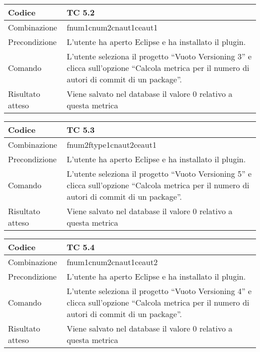 \begin{table}[ht]
\begin{tabular}{|p{3cm}|p{9cm}|}
\hline
\cellcolor{lightgray}Codice				& TC 5.2								\\
\hline
\cellcolor{lightgray}Combinazione		& fnum1cnum2cnaut1ceaut1 									\\
\hline
\cellcolor{lightgray}Precondizione		& L'utente ha aperto Eclipse e ha installato il plugin.				\\
\hline
\cellcolor{lightgray}Comando			& L'utente seleziona il progetto ``Vuoto Versioning 3''  e clicca sull'opzione ``Calcola metrica per il numero di autori di commit di un package''.	\\
\hline
\cellcolor{lightgray}Risultato atteso	& Viene salvato nel database il valore 0 relativo a questa metrica	\\
\hline
\end{tabular}
\end{table}

\begin{table}[ht]
\begin{tabular}{|p{3cm}|p{9cm}|}
\hline
\cellcolor{lightgray}Codice				& TC 5.3								\\
\hline
\cellcolor{lightgray}Combinazione		& fnum2ftype1cnaut2ceaut1								\\
\hline
\cellcolor{lightgray}Precondizione		& L'utente ha aperto Eclipse e ha installato il plugin.					\\
\hline
\cellcolor{lightgray}Comando			& L'utente seleziona il progetto ``Vuoto Versioning 5''  e clicca sull'opzione ``Calcola metrica per il numero di autori di commit di un package''.	\\
\hline
\cellcolor{lightgray}Risultato atteso	& Viene salvato nel database il valore 0 relativo a questa metrica	\\
\hline
\end{tabular}
\end{table}

\begin{table}[ht]
\begin{tabular}{|p{3cm}|p{9cm}|}
\hline
\cellcolor{lightgray}Codice				& TC 5.4								\\
\hline
\cellcolor{lightgray}Combinazione		& fnum1cnum2cnaut1ceaut2							\\
\hline
\cellcolor{lightgray}Precondizione		& L'utente ha aperto Eclipse e ha installato il plugin.			\\
\hline
\cellcolor{lightgray}Comando			& L'utente seleziona il progetto ``Vuoto Versioning 4''  e clicca sull'opzione ``Calcola metrica per il numero di autori di commit di un package''.	\\
\hline
\cellcolor{lightgray}Risultato atteso	& Viene salvato nel database il valore 0 relativo a questa metrica	\\
\hline
\end{tabular}
\end{table}

